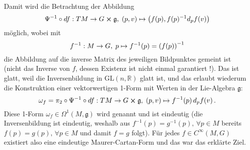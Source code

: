 \documentclass[../H_Analysis_main.tex]{subfiles}
\begin{document}
Damit wird die Betrachtung der Abbildung
\begin{equation*}
\Psi^{-1} \circ df: TM \rightarrow G \cross \mathfrak{g}, \; (p, v) \mapsto \qty(f(p), f(p)^{-1} d_p f(v))
\end{equation*}
möglich, wobei mit
\begin{equation*}
f^{-1}: M \rightarrow G, \; p \mapsto f^{-1}(p) = \qty(f(p))^{-1}
\end{equation*}
die Abbildung auf die inverse Matrix des jeweiligen Bildpunktes gemeint ist (nicht das Inverse von $f$, dessen Existenz ist nicht einmal garantiert !). Das ist glatt, weil die Inversenbildung in $\text{GL}(n, \mathbb{R})$ glatt ist, und das erlaubt wiederum die Konstruktion einer vektorwertigen 1-Form mit Werten in der Lie-Algebra $\mathfrak{g}$:
\begin{equation}
\omega_f = \pi_2 \circ \Psi^{-1} \circ df: TM \rightarrow G \cross \mathfrak{g}, \; (p, v) \mapsto f^{-1}(p) \, d_p f(v) \, .
\end{equation}
Diese 1-Form $\omega_f \in \Omega^1(M, \mathfrak{g})$ wird  genannt und ist eindeutig (die Inversenbildung ist eindeutig, weshalb aus $f^{-1}(p) = g^{-1}(p), \, \forall p \in M$ bereits $f(p) = g(p), \, \forall p \in M$ und damit $f = g$ folgt). Für jedes $f \in C^\infty(M, G)$ existiert also eine eindeutige Maurer-Cartan-Form und das war das erklärte Ziel.


\end{document}
